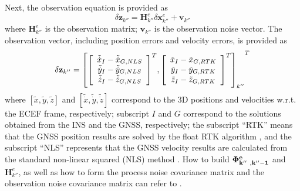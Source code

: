 \documentclass{article}
\begin{document}
Next, the observation equation is provided as 
\[\delta{\boldsymbol{z}}_{k''}={\boldsymbol{H}}^e_{k''}\delta{\boldsymbol{x}}^e_{k''}+{\boldsymbol{v}}_{k''}\] 
where ${\boldsymbol{H}}^e_{k''}$ is the observation matrix; ${\boldsymbol{v}}_{k''}$ is the observation noise vector. The observation vector, including position errors and velocity errors, is provided as
\begin{equation*}
\delta {{\bf{z}}_{k''}} = {\left[ {{{\left[ {\begin{array}{*{20}{c}}
{{\tilde{\dot x}_I} - {\tilde {\dot x}_{G,NLS}}}\\
{{\tilde {\dot y}_I} - {\tilde {\dot y}_{G,NLS}}}\\
{{\tilde {\dot z}_I} - {\tilde {\dot z}_{G,NLS}}}
\end{array}} \right]}^T},{{\left[ {\begin{array}{*{20}{c}}
{{\tilde {x}_I} - {{\tilde x}_{G,RTK}}}\\
{{\tilde {y}_I} - {{\tilde y}_{G,RTK}}}\\
{{\tilde {z}_I} - {{\tilde z}_{G,RTK}}}
\end{array}} \right]}^T}} \right]_{k''}}^T
\end{equation*}
where $\left[\tilde{x},\tilde{y},\tilde{z}\right]$ and $\left[\tilde{\dot{x}},\tilde{\dot{y}},\tilde{\dot{z}}\right]$ correspond to the 3D positions and velocities w.r.t. the ECEF frame, respectively; subscript $I$ and $G$ correspond to the solutions obtained from the INS and the GNSS, respectively; the subscript ``RTK'' means that the GNSS position results are solved by the float RTK algorithm \cite{Luo2022aa}, and the subscript ``NLS'' represents that the GNSS velocity results are calculated from the standard non-linear squared (NLS) method \cite{Luo2019b}. How to build $\bf{\Phi }^e_{k''\ ,k''-1}$ and ${\boldsymbol{H}}^e_{k''}$, as well as how to form the process noise covariance matrix and the observation noise covariance matrix can refer to \cite{Luo2019}. 
\end{document}
